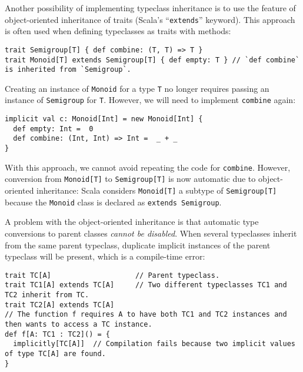 Another possibility of implementing typeclass inheritance is to use
the feature of object-oriented inheritance
of traits (Scala\textsf{'}s \textsf{``}\lstinline!extends!\textsf{''} keyword). This approach
is often used when defining typeclasses as traits with methods:
\begin{lstlisting}
trait Semigroup[T] { def combine: (T, T) => T }
trait Monoid[T] extends Semigroup[T] { def empty: T } // `def combine` is inherited from `Semigroup`.
\end{lstlisting}
Creating an instance of \lstinline!Monoid! for a type \lstinline!T!
no longer requires passing an instance of \lstinline!Semigroup! for
\lstinline!T!. However, we will need to implement \lstinline!combine!
again:
\begin{lstlisting}
implicit val c: Monoid[Int] = new Monoid[Int] {
  def empty: Int =  0
  def combine: (Int, Int) => Int =  _ + _
}
\end{lstlisting}
With this approach, we cannot avoid repeating the code for \lstinline!combine!.
However, conversion from \lstinline!Monoid[T]! to \lstinline!Semigroup[T]!
is now automatic due to object-oriented inheritance:
Scala considers \lstinline!Monoid[T]! a subtype of \lstinline!Semigroup[T]!
because the \lstinline!Monoid! class is declared as \lstinline!extends Semigroup!.

A problem with the object-oriented inheritance is that automatic type
conversions to parent classes \emph{cannot be disabled}. When several
typeclasses inherit from the same parent typeclass, duplicate implicit
instances of the parent typeclass will be present, which is a compile-time
error:
\begin{lstlisting}
trait TC[A]                    // Parent typeclass.
trait TC1[A] extends TC[A]     // Two different typeclasses TC1 and TC2 inherit from TC.
trait TC2[A] extends TC[A]
// The function f requires A to have both TC1 and TC2 instances and then wants to access a TC instance.
def f[A: TC1 : TC2]() = {
  implicitly[TC[A]]  // Compilation fails because two implicit values of type TC[A] are found.
}
\end{lstlisting}

